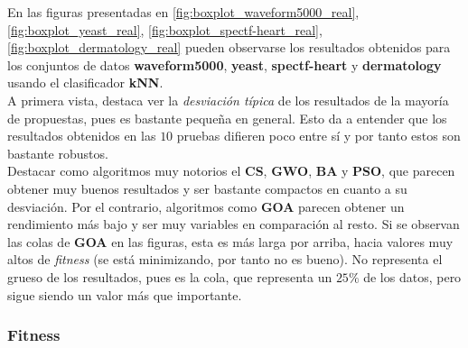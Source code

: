 En las figuras presentadas en \ref{fig:boxplot_waveform5000_real}, \ref{fig:boxplot_yeast_real}, \ref{fig:boxplot_spectf-heart_real}, \ref{fig:boxplot_dermatology_real} pueden observarse los resultados obtenidos para los conjuntos de datos \textbf{waveform5000}, \textbf{yeast}, \textbf{spectf-heart} y \textbf{dermatology} usando el clasificador \textbf{kNN}.\\[6pt]

A primera vista, destaca ver la \textit{desviación típica} de los resultados de la mayoría de propuestas, pues es bastante pequeña en general. Esto da a entender que los resultados obtenidos en las $10$ pruebas difieren poco entre sí y por tanto estos son bastante robustos. \\[6pt]
Destacar como algoritmos muy notorios el \textbf{CS}, \textbf{GWO}, \textbf{BA} y \textbf{PSO}, que parecen obtener muy buenos resultados y ser bastante compactos en cuanto a su desviación. Por el contrario, algoritmos como \textbf{GOA} parecen obtener un rendimiento más bajo y ser muy variables en comparación al resto. Si se observan las colas de \textbf{GOA} en las figuras, esta es más larga por arriba, hacia valores muy altos de \textit{fitness} (se está minimizando, por tanto no es bueno). No representa el grueso de los resultados, pues es la cola, que representa un $25\%$ de los datos, pero sigue siendo un valor más que importante.\\[6pt]

\subsubsection{Fitness}